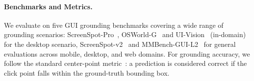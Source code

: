\paragraph{Benchmarks and Metrics.}
We evaluate \method{} on five GUI grounding benchmarks covering a wide range of grounding scenarios: ScreenSpot-Pro~\citep{li2025screenspot}, OSWorld-G~\citep{xie2505scaling} and UI-Vision~\citep{nayak2025ui} (in-domain) for the desktop scenario, ScreenSpot-v2~\citep{wu2024atlas} and MMBench-GUI-L2~\citep{wang2025mmbench} for general evaluations across mobile, desktop, and web domains. 
For grounding accuracy, we follow the standard center-point metric~\citep{lin2024showui}: a prediction is considered correct if the click point falls within the ground-truth bounding box.

